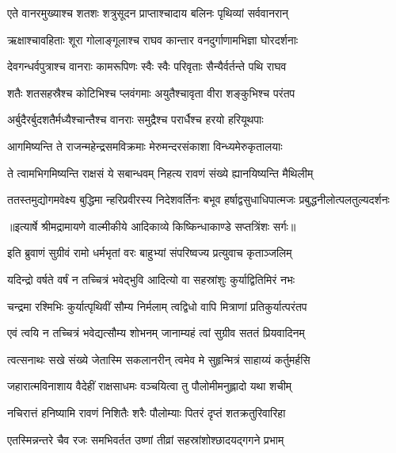 \twolineshloka
{एते वानरमुख्याश्च शतशः शत्रुसूदन}
{प्राप्ताश्चादाय बलिनः पृथिव्यां सर्ववानरान्} %

\twolineshloka
{ऋक्षाश्चावहिताः शूरा गोलाङ्गूलाश्च राघव}
{कान्तार वनदुर्गाणामभिज्ञा घोरदर्शनाः} %

\twolineshloka
{देवगन्धर्वपुत्राश्च वानराः कामरूपिणः}
{स्वैः स्वैः परिवृताः सैन्यैर्वर्तन्ते पथि राघव} %

\twolineshloka
{शतैः शतसहस्रैश्च कोटिभिश्च प्लवंगमाः}
{अयुतैश्चावृता वीरा शङ्कुभिश्च परंतप} %

\twolineshloka
{अर्बुदैरर्बुदशतैर्मध्यैश्चान्तैश्च वानराः}
{समुद्रैश्च परार्धैश्च हरयो हरियूथपाः} %

\twolineshloka
{आगमिष्यन्ति ते राजन्महेन्द्रसमविक्रमाः}
{मेरुमन्दरसंकाशा विन्ध्यमेरुकृतालयाः} %

\twolineshloka
{ते त्वामभिगमिष्यन्ति राक्षसं ये सबान्धवम्}
{निहत्य रावणं संख्ये ह्यानयिष्यन्ति मैथिलीम्} %

\fourlineindentedshloka
{ततस्तमुद्योगमवेक्ष्य बुद्धिमा}
{न्हरिप्रवीरस्य निदेशवर्तिनः}
{बभूव हर्षाद्वसुधाधिपात्मजः}
{ प्रबुद्धनीलोत्पलतुल्यदर्शनः} %


{॥इत्यार्षे श्रीमद्रामायणे वाल्मीकीये आदिकाव्ये किष्किन्धाकाण्डे सप्तत्रिंशः सर्गः॥}


\twolineshloka
{इति ब्रुवाणं सुग्रीवं रामो धर्मभृतां वरः}
{बाहुभ्यां संपरिष्वज्य प्रत्युवाच कृताञ्जलिम्} %

\twolineshloka
{यदिन्द्रो वर्षते वर्षं न तच्चित्रं भवेद्भुवि}
{आदित्यो वा सहस्रांशुः कुर्याद्वितिमिरं नभः} %

\twolineshloka
{चन्द्रमा रश्मिभिः कुर्यात्पृथिवीं सौम्य निर्मलाम्}
{त्वद्विधो वापि मित्राणां प्रतिकुर्यात्परंतप} %

\twolineshloka
{एवं त्वयि न तच्चित्रं भवेद्यत्सौम्य शोभनम्}
{जानाम्यहं त्वां सुग्रीव सततं प्रियवादिनम्} %

\twolineshloka
{त्वत्सनाथः सखे संख्ये जेतास्मि सकलानरीन्}
{त्वमेव मे सुहृन्मित्रं साहाय्यं कर्तुमर्हसि} %

\twolineshloka
{जहारात्मविनाशाय वैदेहीं राक्षसाधमः}
{वञ्चयित्वा तु पौलोमीमनुह्लादो यथा शचीम्} %

\twolineshloka
{नचिरात्तं हनिष्यामि रावणं निशितैः शरैः}
{पौलोम्याः पितरं दृप्तं शतक्रतुरिवारिहा} %

\twolineshloka
{एतस्मिन्नन्तरे चैव रजः समभिवर्तत}
{उष्णां तीव्रां सहस्रांशोश्छादयद्गगने प्रभाम्} %

